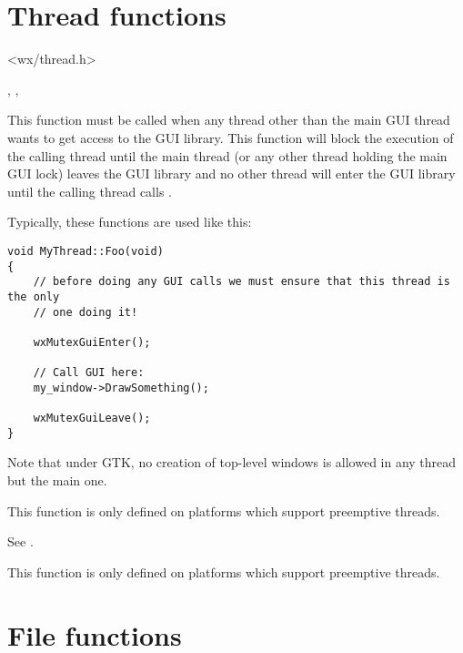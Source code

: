 \section{Thread functions}\label{threadfunctions}


<wx/thread.h>


, , 

\label{wxmutexguienter}


This function must be called when any thread other than the main GUI thread
wants to get access to the GUI library. This function will block the execution
of the calling thread until the main thread (or any other thread holding the
main GUI lock) leaves the GUI library and no other thread will enter the GUI
library until the calling thread calls .

Typically, these functions are used like this:

\begin{verbatim}
void MyThread::Foo(void)
{
    // before doing any GUI calls we must ensure that this thread is the only
    // one doing it!

    wxMutexGuiEnter();

    // Call GUI here:
    my_window->DrawSomething();

    wxMutexGuiLeave();
}
\end{verbatim}

Note that under GTK, no creation of top-level windows is allowed in any
thread but the main one.

This function is only defined on platforms which support preemptive
threads.

\label{wxmutexguileave}


See .

This function is only defined on platforms which support preemptive
threads.

\section{File functions}\label{filefunctions}

